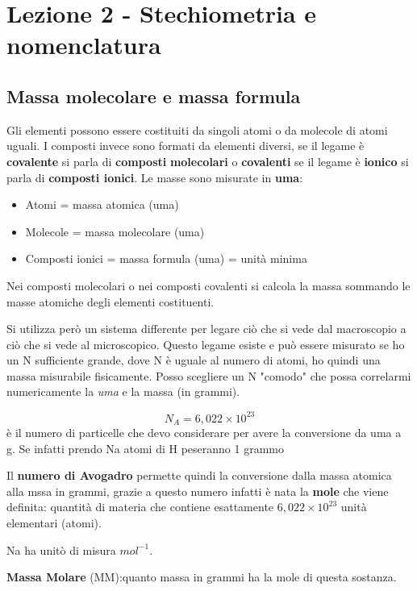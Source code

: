 \chapter{Lezione 2 - Stechiometria e nomenclatura}





\section{Massa molecolare e massa formula}
Gli elementi possono essere costituiti da singoli atomi o da molecole di atomi uguali. I composti invece sono formati da elementi diversi, se il legame è \textbf{covalente} si parla di \textbf{composti} \textbf{molecolari} o \textbf{covalenti} se il legame è \textbf{ionico} si parla di \textbf{composti ionici}. 
Le masse sono misurate in \textbf{uma}: 
\begin{itemize}
    \item Atomi =  massa atomica (uma)
    \item Molecole =  massa molecolare  (uma)
    \item Composti ionici = massa formula  (uma) = unità minima
\end{itemize}

Nei composti molecolari o nei composti covalenti si calcola la massa sommando le masse atomiche degli elementi costituenti. 

Si utilizza però un sistema differente per legare ciò che si vede dal macroscopio a ciò che si vede al microscopico. 
Questo legame esiste e può essere misurato se ho un N sufficiente grande, dove N è uguale al numero di atomi, ho quindi una massa misurabile fisicamente. Posso scegliere un N "comodo" che possa correlarmi numericamente la \textit{uma} e la massa (in grammi). 

\[N_A= 6,022 \times 10^{23}\]è il numero di particelle che devo considerare per avere la conversione da uma a g. Se infatti prendo Na atomi di H peseranno 1 grammo

Il \textbf{numero di Avogadro} permette quindi la conversione dalla massa atomica alla mssa in grammi, grazie a questo numero infatti è nata la \textbf{mole} che viene definita: quantità di materia che contiene esattamente $ 6,022 \times 10^{23}$ unità elementari (atomi).

Na ha unitò di misura $mol^{-1}$. 

\textbf{Massa Molare} (MM):quanto massa in grammi ha la mole di questa sostanza.

